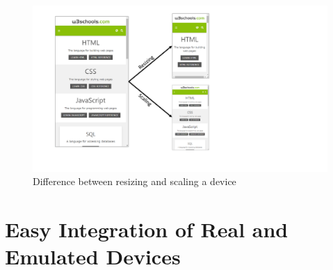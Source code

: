 \begin{figure}[H]
  \centering
    \includegraphics[width=1.0\textwidth]{images/difference_scaling_resizing.pdf}
	\caption[Difference between resizing and scaling a device]{Difference between resizing and scaling a device}
	\label{fig:difference_resizing_scaling}
\end{figure}

\section{Easy Integration of Real and Emulated Devices}

